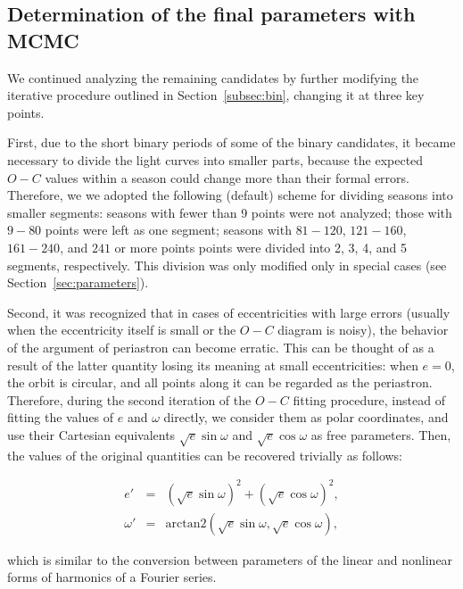 \documentclass[twocolumn,times]{aastex63}
\begin{document}
\subsection{Determination of the final parameters with MCMC} \label{subsec:mcmc}

We continued analyzing the remaining candidates by further modifying the iterative procedure outlined in Section~\ref{subsec:bin},
changing it at three key points.

First, due to the short binary periods of some of the binary candidates, it became necessary to divide the light curves into
smaller parts, because the expected $O-C$ values within a season could change more than their formal errors. Therefore, we
we adopted the following (default) scheme for dividing seasons into smaller segments: seasons with fewer than 9 points were not
analyzed; those with $9-80$ points were left as one segment; seasons with $81-120$, $121-160$, $161-240$, and $241$
or more points points were divided into 2, 3, 4, and 5 segments, respectively.
This division was only modified only in special cases (see Section~\ref{sec:parameters}).

Second, it was recognized that in cases of eccentricities with large errors (usually when the eccentricity itself is small or
the $O-C$ diagram is noisy), the behavior of the argument of periastron can become erratic. This can be thought of as a result of
the latter quantity losing its meaning at small eccentricities: when $e=0$, the orbit is circular, and all points along it
can be regarded as the periastron. Therefore, during the second iteration of the $O-C$ fitting procedure, instead of fitting
the values of $e$ and $\omega$ directly, we consider
them as polar coordinates, and use their Cartesian equivalents $\sqrt{e}\sin\omega$ and $\sqrt{e}\cos\omega$
as free parameters.
Then, the values of the original quantities can be recovered trivially as follows:

\begin{eqnarray}
    \label{eq:econv}
    e' &=& (\sqrt{e}\sin\omega)^2 + (\sqrt{e}\cos\omega)^2, \\
    \label{eq:omegaconv}
    \omega' &=& \mathrm{arctan2} (\sqrt{e}\sin\omega,\sqrt{e}\cos\omega),
\end{eqnarray}

\noindent which is similar to the conversion between parameters of the linear and nonlinear forms of harmonics of a Fourier series.
\end{document}
